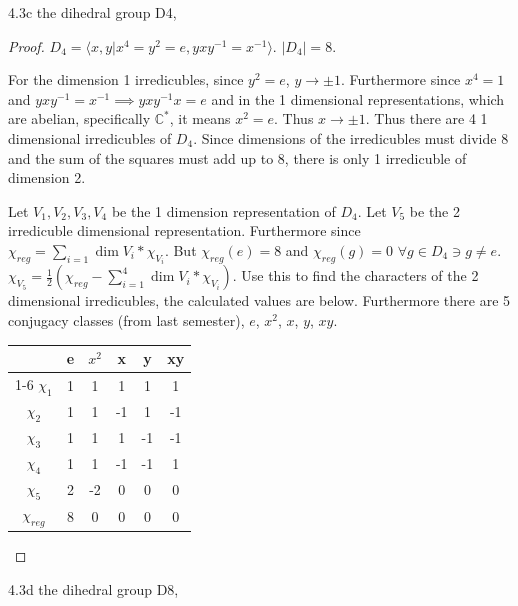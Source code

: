 \documentclass{article}
\newcommand{\C}{\mathbb{C}}
\newcommand{\angles}[1]{\langle #1 \rangle}
\begin{document}
\bigskip

\begin{PROB}{4.3c}\label{Problem 4.3c.}
    the dihedral group D4,
\end{PROB}
\begin{proof}
    $D_4 = \angles{x, y | x^4 = y^2 = e, yxy^{-1}=x^{-1}}$. $|D_4| = 8$. 

    For the dimension 1 irredicubles, since $y^2 = e$, $y \to \pm 1$. Furthermore since $x^4 = 1$ and $yxy^{-1} = x^{-1} \implies yxy^{-1}x = e$ and in the 1 dimensional representations, which are abelian, specifically $\C^*$, it means $x^2 = e$. Thus $x \to \pm 1$. Thus there are 4 1 dimensional irredicubles of $D_4$. Since dimensions of the irredicubles must divide 8 and the sum of the squares must add up to 8, there is only 1 irredicuble of dimension 2. 
    
    Let $V_1, V_2, V_3, V_4$ be the 1 dimension representation of $D_4$. Let $V_5$ be the 2 irredicuble dimensional representation.    
    Furthermore since $\chi_{reg} = \sum_{i = 1} \dim V_i * \chi_{V_i}$. But $\chi_{reg}(e) = 8$ and $\chi_{reg}(g) = 0$ $\forall g \in D_4 \ni g \neq e$. $\chi_{V_5} = \frac{1}{2} (\chi_{reg} - \sum_{i = 1}^4 \dim V_i * \chi_{V_i})$. Use this to find the characters of the 2 dimensional irredicubles, the calculated values are below. Furthermore there are 5 conjugacy classes (from last semester), $e$, $x^2$, $x$, $y$, $xy$.
    
    
    \begin{tabular}{c | c c c c c }
        & e & $x^2$ & x & y & xy  \\
        \cline{1-6}
        $\chi_1$ & 1 & 1 & 1 & 1 & 1 \\
        $\chi_2$ & 1 & 1 & -1 & 1 & -1 \\
        $\chi_3$ & 1 & 1 & 1 & -1 & -1 \\
        $\chi_4$ & 1 & 1 & -1 & -1 & 1 \\
        $\chi_5$ & 2 & -2 & 0 & 0 & 0 \\
        $\chi_{reg}$ & 8 & 0 & 0 & 0 & 0 

    \end{tabular} 
\end{proof}
\begin{PROB}{4.3d}\label{Problem 4.3d.}
    the dihedral group D8,
\end{PROB}
\end{document}
